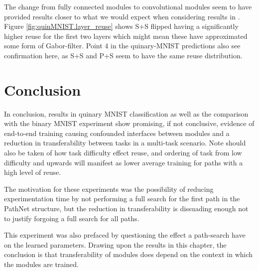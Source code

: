 The change from fully connected modules to convolutional modules seem to have provided results closer to what we would expect when considering results in \cite{yosinski2014transferable}. Figure \ref{fig:quinMNIST.layer_reuse} shows S+S flipped having a significantly higher reuse for the first two layers which might mean these have approximated some form of Gabor-filter. Point 4 in the quinary-MNIST predictions also see confirmation here, as S+S and P+S seem to have the same reuse distribution. 

\section{Conclusion}
In conclusion, results in quinary MNIST classification as well as the comparison with the binary MNIST experiment show promising, if not conclusive, evidence of end-to-end training causing confounded interfaces between modules and a reduction in transferability between tasks in a multi-task scenario. Note should also be taken of how task difficulty effect reuse, and ordering of task from low difficulty and upwards will manifest as lower average training for paths with a high level of reuse.

The motivation for these experiments was the possibility of reducing experimentation time by not performing a full search for the first path in the PathNet structure, but the reduction in transferability is dissuading enough not to justify forgoing a full search for all paths. 

This experiment was also prefaced by questioning the effect a path-search have on the learned parameters. Drawing upon the results in this chapter, the conclusion is that transferability of modules does depend on the context in which the modules are trained. 